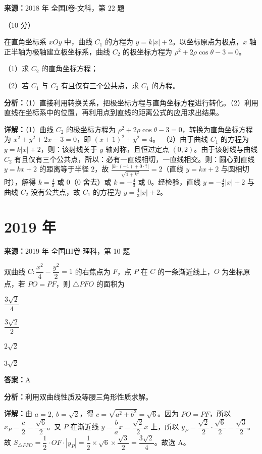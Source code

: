 \begin{question}[points=10]
\textbf{来源：}2018 年 全国I卷-文科，第 22 题\par
[选修 4-4：坐标系与参数方程]（10 分）

在直角坐标系 $xOy$ 中，曲线 $C_1$ 的方程为 $y=k|x|+2$。以坐标原点为极点，$x$ 轴正半轴为极轴建立极坐标系，曲线 $C_2$ 的极坐标方程为 $\rho^2+2\rho\cos\theta-3=0$。

（1）求 $C_2$ 的直角坐标方程；

（2）若 $C_1$ 与 $C_2$ 有且仅有三个公共点，求 $C_1$ 的方程。
\begin{solution}

\textbf{分析：}（1）直接利用转换关系，把极坐标方程与直角坐标方程进行转化。（2）利用直线在坐标系中的位置，再利用点到直线的距离公式的应用求出结果。

\textbf{详解：}（1）曲线 $C_2$ 的极坐标方程为 $\rho^2+2\rho\cos\theta-3=0$，转换为直角坐标方程为 $x^2+y^2+2x-3=0$，即 $(x+1)^2+y^2=4$。
（2）由于曲线 $C_1$ 的方程为 $y=k|x|+2$，则：该射线关于 $y$ 轴对称，且恒过定点 $(0,2)$。由于该射线与曲线 $C_2$ 有且仅有三个公共点，所以：必有一直线相切，一直线相交。则：圆心到直线 $y=kx+2$ 的距离等于半径 $2$，故 $\frac{|k\cdot(-1)+0\cdot?|}{\sqrt{1+k^2}}=2$（直线 $y=kx+2$ 与圆相切时），解得 $k=\frac{4}{3}$ 或 $0$（$0$ 舍去）或 $k=-\frac{4}{3}$ 或 $0$。经检验，直线 $y=-\frac{4}{3}|x|+2$ 与曲线 $C_2$ 没有公共点，故 $C_1$ 的方程为 $y=\frac{4}{3}|x|+2$。
\end{solution}
\end{question}

\section*{2019 年}

\begin{question}[points=5]
\textbf{来源：}2019 年 全国III卷-理科，第 10 题\par
双曲线 $C: \dfrac{x^2}{4} - \dfrac{y^2}{2} = 1$ 的右焦点为 $F$，点 $P$ 在 $C$ 的一条渐近线上，$O$ 为坐标原点，若 $PO = PF$，则 $\triangle PFO$ 的面积为
\begin{choices}
  \item $\dfrac{3\sqrt{2}}{4}$
  \item $\dfrac{3\sqrt{2}}{2}$
  \item $2\sqrt{2}$
  \item $3\sqrt{2}$
\end{choices}
\begin{solution}
\textbf{答案：}A

\textbf{分析：}利用双曲线性质及等腰三角形性质求解。

\textbf{详解：}由 $a=2,\ b=\sqrt{2}$，得 $c=\sqrt{a^2+b^2}=\sqrt{6}$。因为 $PO=PF$，所以 $x_P = \dfrac{c}{2} = \dfrac{\sqrt{6}}{2}$。又 $P$ 在渐近线 $y=\dfrac{b}{a}x = \dfrac{\sqrt{2}}{2}x$ 上，所以 $y_P = \dfrac{\sqrt{2}}{2} \cdot \dfrac{\sqrt{6}}{2} = \dfrac{\sqrt{3}}{2}$。故 $S_{\triangle PFO} = \dfrac{1}{2} \cdot OF \cdot |y_P| = \dfrac{1}{2} \times \sqrt{6} \times \dfrac{\sqrt{3}}{2} = \dfrac{3\sqrt{2}}{4}$。故选 A。
\end{solution}
\end{question}

